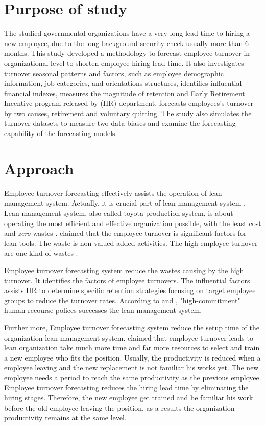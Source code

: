\section{Purpose of study}
The studied governmental organizations have a very long lead time to hiring a new employee, due to the long background security check usually more than 6 months. This study developed a methodology to forecast employee turnover in organizational level to shorten employee hiring lead time. It also investigates turnover seasonal patterns and factors, such as employee demographic information, job categories, and orientations structures, identifies influential financial indexes, measures the magnitude of retention and Early Retirement Incentive program \citep{ERIP} released by (HR) department, forecasts employees's turnover by two causes, retirement and voluntary quitting. The study also simulates the turnover datasets to measure two data biases and examine the forecasting capability of the forecasting models.   
\section{Approach}
Employee turnover forecasting effectively assists the operation of lean management system. Actually, it is crucial part of lean management system \citep{allway2002}. Lean management system, also called toyota production system, is about operating the most efficient and effective organization possible, with the least cost and {\it zero} wastes \citep{jackson1996}. \citet{allway2002} claimed that the employee turnover is significant factors for lean tools. The waste is non-valued-added activities. The high employee turnover are one kind of wastes \citep{kilpatrick2003}. 

Employee turnover forecasting system reduce the wastes causing by the high turnover. It identifies the factors of employee turnovers. The influential factors assists HR to determine specific retention strategies focusing on target employee groups to reduce the turnover rates. According to \citet{yeung1997} and \citet{kochan1992}, "high-commitment" human recourse polices successes the lean management system.   

Further more, Employee turnover forecasting system reduce the setup time of the organization lean management system. \citet{lin1999} claimed that employee turnover leads to lean organization take much more time and far more resources to select and train a new employee who fits the position. Usually, the productivity is reduced when a employee leaving and the new replacement is not familiar his works yet. The new employee needs a period to reach the same productivity as the previous employee. Employee turnover forecasting reduces the hiring lead time by eliminating the hiring stages. Therefore, the new employee get trained and be familiar his work before the old employee leaving the position, as a results the organization productivity remains at the same level.  

